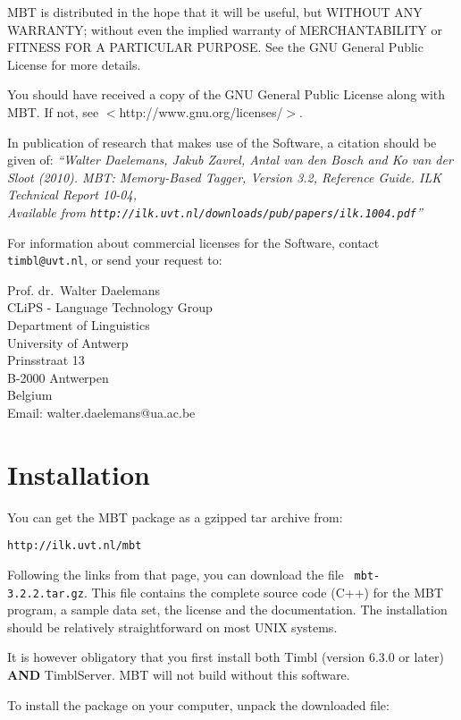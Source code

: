 \documentclass{report}
\begin{document}
MBT is distributed in the hope that it will be useful, but WITHOUT
ANY WARRANTY; without even the implied warranty of MERCHANTABILITY or
FITNESS FOR A PARTICULAR PURPOSE.  See the GNU General Public License
for more details.

You should have received a copy of the GNU General Public License
along with MBT.  If not, see $<$http://www.gnu.org/licenses/$>$.

In publication of research that makes use of the Software, a
citation should be given of: {\em ``Walter Daelemans, Jakub Zavrel,
Antal van den Bosch and Ko van der Sloot (2010). MBT: Memory-Based
Tagger, Version 3.2, Reference Guide. ILK Technical Report 10-04, \\
Available from
{\tt http://ilk.uvt.nl/downloads/pub/papers/ilk.1004.pdf}''}

For information about commercial licenses for the Software,
contact {\tt timbl@uvt.nl}, or send your request to:

Prof. dr.~Walter Daelemans\\
CLiPS - Language Technology Group\\
Department of Linguistics\\
University of Antwerp\\
Prinsstraat 13 \\
B-2000 Antwerpen \\
Belgium \\
Email: walter.daelemans@ua.ac.be

\pagestyle{headings}

\chapter{Installation}
\vspace{-1cm}
You can get the MBT package as a gzipped tar archive from:

{\tt http://ilk.uvt.nl/mbt}

Following the links from that page, you can download the file {\tt
  mbt-3.2.2.tar.gz}. This file contains the complete source code (C++)
for the MBT program, a sample data set, the license and the
documentation.
The installation should be relatively straightforward on most UNIX systems.

It is however obligatory that you first install both Timbl (version 6.3.0 or later) {\bf AND} TimblServer. MBT will not build without this software.

To install the package on your computer, unpack the downloaded file:
\end{document}
